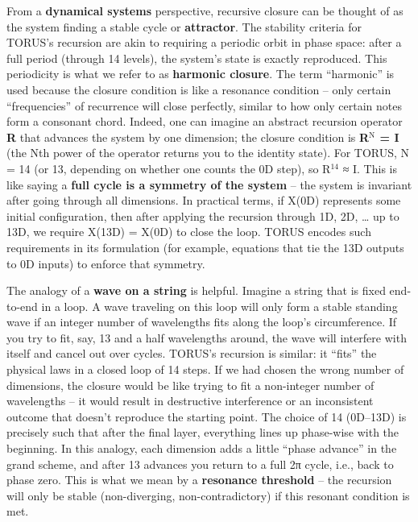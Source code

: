 \documentclass[]{article}
\newcommand{\superscript}[1]{\ensuremath{^{\mathrm{#1}}}}
\begin{document}
From a \textbf{dynamical systems} perspective, recursive closure can be
thought of as the system finding a stable cycle or \textbf{attractor}.
The stability criteria for TORUS's recursion are akin to requiring a
periodic orbit in phase space: after a full period (through 14 levels),
the system's state is exactly reproduced. This periodicity is what we
refer to as \textbf{harmonic closure}. The term ``harmonic'' is used
because the closure condition is like a resonance condition -- only
certain ``frequencies'' of recurrence will close perfectly, similar to
how only certain notes form a consonant chord. Indeed, one can imagine
an abstract recursion operator \textbf{R} that advances the system by
one dimension; the closure condition is \textbf{R\superscript{N} = I} (the Nth
power of the operator returns you to the identity state)​. For TORUS, N
= 14 (or 13, depending on whether one counts the 0D step), so R\superscript{14} ≈
I. This is like saying a \textbf{full cycle is a symmetry of the system}
-- the system is invariant after going through all dimensions. In
practical terms, if X(0D) represents some initial configuration, then
after applying the recursion through 1D, 2D, \ldots{} up to 13D, we
require X(13D) = X(0D) to close the loop​. TORUS encodes such
requirements in its formulation (for example, equations that tie the 13D
outputs to 0D inputs) to enforce that symmetry.

The analogy of a \textbf{wave on a string} is helpful. Imagine a string
that is fixed end-to-end in a loop. A wave traveling on this loop will
only form a stable standing wave if an integer number of wavelengths
fits along the loop's circumference. If you try to fit, say, 13 and a
half wavelengths around, the wave will interfere with itself and cancel
out over cycles. TORUS's recursion is similar: it ``fits'' the physical
laws in a closed loop of 14 steps. If we had chosen the wrong number of
dimensions, the closure would be like trying to fit a non-integer number
of wavelengths -- it would result in destructive interference or an
inconsistent outcome that doesn't reproduce the starting point​. The
choice of 14 (0D--13D) is precisely such that after the final layer,
everything lines up phase-wise with the beginning. In this analogy, each
dimension adds a little ``phase advance'' in the grand scheme, and after
13 advances you return to a full 2π cycle, i.e., back to phase zero​.
This is what we mean by a \textbf{resonance threshold} -- the recursion
will only be stable (non-diverging, non-contradictory) if this resonant
condition is met.
\end{document}
